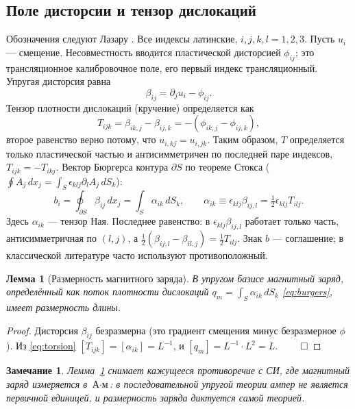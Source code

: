 \documentclass[12pt,a4paper]{article}
\newtheorem{lemma}{Лемма}
\newtheorem{remark}{Замечание}
\begin{document}
\subsection{Поле дисторсии и тензор дислокаций}
Обозначения следуют Лазару \cite{lazar2010pla}. Все индексы латинские, $i,j,k,l=1,2,3$.
Пусть $u_i$ --- смещение. Несовместность вводится пластической дисторсией
$\phi_{ij}$; это трансляционное калибровочное поле, его первый индекс трансляционный.
Упругая дисторсия равна
\begin{equation}
\beta_{ij}=\partial_ju_i-\phi_{ij}.
\label{eq:beta}
\end{equation}
Тензор плотности дислокаций (кручение) определяется как
\begin{equation}
T_{ijk}=\beta_{ik,j}-\beta_{ij,k}=-\left(\phi_{ik,j}-\phi_{ij,k}\right),
\label{eq:torsion}
\end{equation}
второе равенство верно потому, что $u_{i,kj}=u_{i,jk}$. Таким образом, $T$ определяется
только пластической частью и антисимметричен по последней паре индексов,
$T_{ijk}=-T_{ikj}$. Вектор Бюргерса контура $\partial S$ по теореме Стокса
($\oint A_j\,dx_j=\int_S\epsilon_{klj}\partial_lA_j\,dS_k$):
\begin{equation}
b_i=\oint_{\partial S}\beta_{ij}\,dx_j=\int_S\alpha_{ik}\,dS_k,\qquad
\alpha_{ik}\equiv\epsilon_{klj}\beta_{ij,l}=\tfrac12\epsilon_{klj}T_{ilj}.
\label{eq:burgers}
\end{equation}
Здесь $\alpha_{ik}$ --- тензор Ная. Последнее равенство: в
$\epsilon_{klj}\beta_{ij,l}$ работает только часть, антисимметричная по $(l,j)$, а
$\tfrac12(\beta_{ij,l}-\beta_{il,j})=\tfrac12T_{ilj}$. Знак $b$ --- соглашение;
в классической литературе \cite{hirth1982} часто используют противоположный.

\begin{lemma}[Размерность магнитного заряда]
\label{lem:qm}
В упругом базисе магнитный заряд, определённый как поток плотности дислокаций
$q_m=\int_S\alpha_{ik}\,dS_k$ \eqref{eq:burgers}, имеет размерность длины.
\end{lemma}
\begin{proof}
Дисторсия $\beta_{ij}$ безразмерна (это градиент смещения минус безразмерное
$\phi$). Из \eqref{eq:torsion} $[T_{ijk}]=[\alpha_{ik}]=L^{-1}$, и
$[q_m]=L^{-1}\cdot L^{2}=L$. $\qed$
\end{proof}

\begin{remark}
Лемма~\ref{lem:qm} снимает кажущееся противоречие с СИ, где магнитный заряд
измеряется в $\text{А}\cdot\text{м}$: в последовательной упругой теории ампер не
является первичной единицей, и размерность заряда диктуется самой теорией.
\end{remark}
\end{document}
